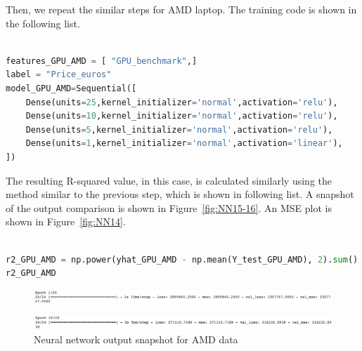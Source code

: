 \documentclass{scrartcl}
\begin{document}
\noindent Then, we repeat the similar steps for AMD laptop. The training code is shown in the following list. 

\begin{lstlisting}[language=Python, caption= Code for training AMD data, basicstyle=\tiny,captionpos=b]

features_GPU_AMD = [ "GPU_benchmark",]
label = "Price_euros"
model_GPU_AMD=Sequential([
    Dense(units=25,kernel_initializer='normal',activation='relu'),
    Dense(units=10,kernel_initializer='normal',activation='relu'),
    Dense(units=5,kernel_initializer='normal',activation='relu'),
    Dense(units=1,kernel_initializer='normal',activation='linear'),
])
\end{lstlisting}

\noindent The resulting R-squared value, in this case, is calculated similarly using the method similar to the previous step, which is shown in following list. A snapshot of the output comparison is shown in Figure~\ref{fig:NN15-16}. An MSE plot is shown in Figure~\ref{fig:NN14}. \\

\begin{lstlisting}[language=Python, caption= Code output for MSE AMD training,basicstyle=\tiny,captionpos=b]

r2_GPU_AMD = np.power(yhat_GPU_AMD - np.mean(Y_test_GPU_AMD), 2).sum() / np.power(Y_test_GPU_AMD - np.mean(Y_test_GPU_AMD), 2).sum()
r2_GPU_AMD

\end{lstlisting}

\begin{figure}
         \centering
         \includegraphics[width=\textwidth]{Graphics/Neural Network Images/NN18.png}
\end{figure}
     
\begin{figure}
         \centering
         \includegraphics[width=\textwidth]{Graphics/Neural Network Images/NN19.png}
         \caption{Neural network output snapshot for AMD data}
         \label{fig:NN18-19}
\end{figure}
\end{document}
